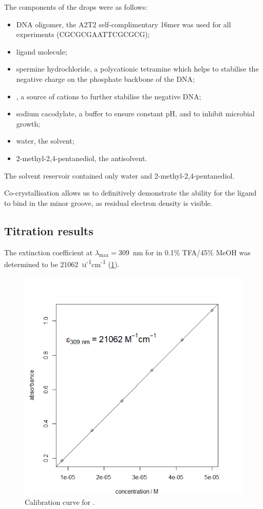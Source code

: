 \begin{refsection}
The components of the drops were as follows:
\begin{itemize}
    \item DNA oligomer, the A2T2 self-complimentary 16mer was used for all experiments (CGCGCGAATTCGCGCG);
    \item ligand molecule;
    \item spermine hydrochloride, a polycationic tetramine which helps to stabilise the negative charge on the phosphate backbone of the DNA;
    \item {}, a source of  cations to further stabilise the negative DNA;
    \item sodium cacodylate, a buffer to ensure constant pH, and to inhibit microbial growth;
    \item water, the solvent;
    \item 2-methyl-2,4-pentanediol, the antisolvent.
\end{itemize}

The solvent reservoir contained only water and 2-methyl-2,4-pentanediol.

Co-crystallisation allows us to definitively demonstrate the ability for the ligand to bind in the minor groove, as residual electron density is visible.

\subsection{Titration results}

The extinction coefficient at $\lambda_{\text{max}} = 309$~nm for  in 0.1\% TFA/45\% MeOH was determined to be 21062~\textsc{m}\textsuperscript{-1}cm\textsuperscript{-1} (\cref{fig:ebs-rhs-ph-calcurve}).

\begin{figure}
    \includegraphics[width=0.5\linewidth]{Figures/ebshoe-calibration.png}
    \caption{Calibration curve for .}
    \label{fig:ebs-rhs-ph-calcurve}
\end{figure}


\end{refsection}
